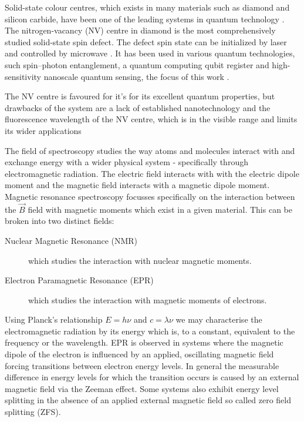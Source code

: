 Solid-state colour centres, which exists in many materials such as diamond and silicon carbide, have been one of the leading systems in quantum technology
\cite{Son2020, Awschalom2018}. 
The nitrogen-vacancy (NV) centre in diamond is the most comprehensively studied solid-state spin defect. The defect spin state can be initialized by laser and controlled by microwave \cite{Zhang2020, Atatre2018, Schirhagl2014}. It has been used in various quantum technologies, such spin–photon entanglement, a quantum computing qubit register and high-sensitivity nanoscale quantum sensing, the focus of this work \cite{Hensen2015, PhysRevX.9.031045}. 


The NV centre is favoured for it's for its excellent quantum properties, but
drawbacks of the system are a lack of established nanotechnology and the fluorescence wavelength of the NV centre, which is in the visible range and limits its wider applications \cite{Koehl2011, Christle2014, Widmann2014} 


The field of spectroscopy studies the way atoms and molecules interact with and exchange energy with a wider physical system - specifically through electromagnetic radiation. The electric field interacts with with the electric dipole moment and the magnetic field interacts with a magnetic dipole moment.
Magnetic resonance spectroscopy focusses specifically on the interaction between the $\vec{B}$ field with magnetic moments which exist in a given material. This can be broken into two distinct fields:

\begin{description}
	\item [Nuclear Magnetic Resonance (NMR)] which studies the interaction with nuclear magnetic moments.
	\item [Electron Paramagnetic Resonance (EPR)] which studies the interaction with magnetic moments of electrons.
\end{description}

Using Planck's relationship $E = h \nu$  and $c = \lambda \nu$ we may characterise the electromagnetic radiation by its energy which is, to a constant, equivalent to the frequency or the wavelength. EPR is observed in systems where the magnetic dipole of the electron is influenced by an applied, oscillating magnetic field forcing transitions between electron energy levels. In general the measurable difference in energy levels for which the transition occurs is caused by an external magnetic field via the Zeeman effect. Some systems also exhibit energy level splitting in the absence of an applied external magnetic field so called zero field splitting (ZFS).

